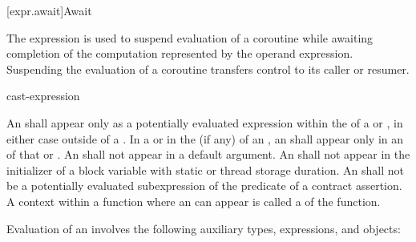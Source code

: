 [expr.await]{Await}
%
%

\pnum
The  expression is used to suspend evaluation of a
coroutine while awaiting completion of
the computation represented by the operand expression.
Suspending the evaluation of a coroutine
transfers control to its caller or resumer.

\begin{bnf}
\br
     cast-expression
\end{bnf}

\pnum
An  shall appear only as a potentially evaluated
expression within the  of a
 or ,
in either case
outside of a .
In a  or in the
 (if any)
of an , an 
shall appear only in an  of that
 or .
An  shall not appear in a
default argument.
An  shall not appear in the initializer of
a block variable with static or thread storage duration.
An  shall not be
a potentially evaluated subexpression
of the predicate of a contract assertion.
A context within a function where an  can appear
is called a  of the function.

\pnum
Evaluation of an  involves the following
auxiliary types, expressions, and objects:

